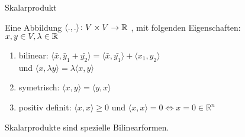 \documentclass[class=article, crop=false]{standalone}
\begin{document}
\begin{zettel}{Skalarprodukt}
\begin{flashcard}
    \begin{definition}[Skalarprodukt]
        Eine Abbildung $ \langle .,.\rangle \colon V \times V\to \mathbb{R} $ , mit folgenden Eigenschaften:\\
        $x,y \in  V, \lambda \in  \mathbb{R} $ 
    \begin{enumerate}
        \item bilinear: $ \langle \bar{x},\bar{y}_1+\bar{y_2}\rangle  = \langle \bar{x},\bar{y_1}\rangle + \langle x_1,y_2\rangle $\\
            und $ \langle x,\lambda y \rangle = \lambda \langle x,y\rangle $
        \item symetrisch: $ \langle x,y\rangle = \langle y,x\rangle $ 
        \item positiv definit: $ \langle x,x\rangle \geq 0 $ und $ \langle x,x\rangle  = 0 \iff  x = 0 \in  \mathbb{R}^n$ 
    \end{enumerate}
        \end{definition}
\end{flashcard}
\begin{remark}
Skalarprodukte sind spezielle Bilinearformen.
\end{remark}
\end{zettel}
\end{document}
